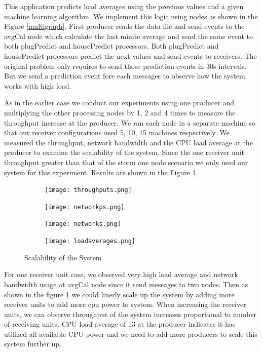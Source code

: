 This application predicts load averages using the previous values and a given machine learning algorithm. We implement this logic using nodes as shown in the Figure \ref{multigraph}. First producer reads the data file and send events to the avgCal node which calculate the last minite average and send the same event to both plugPredict and housePredict processors. Both plugPredict and housePredict processors predict the next values and send events to receivers. The original problem only requires to send those prediction events in 30s intervals. But we send a prediction event fore each messages to observe how the system works with high load.
 
As in the earlier case we conduct our experiments using one producer and multiplying the other processing nodes by 1, 2 and 4 times to measure the throughput increase at the producer. We ran each node in a separate machine so that our receiver configurations used 5, 10, 15 machines respectively. We measured the throughput,  network bandwidth and the CPU load average at the producer to examine the scalability of the system. Since the one receiver unit throughput greater than that of the storm one node scenario we only used our system for this experiment.  Results are shown in the Figure \ref{scalability}.

\begin{figure}
        \centering
        \begin{subfigure}[b]{0.45\textwidth}
                \texttt{[image: throughputs.png]}
        \end{subfigure}
        \begin{subfigure}[b]{0.45\textwidth}
                \texttt{[image: networkps.png]}
        \end{subfigure}
        \begin{subfigure}[b]{0.45\textwidth}
                \texttt{[image: networks.png]}
        \end{subfigure}
        \begin{subfigure}[b]{0.45\textwidth}
                \texttt{[image: loadaverages.png]}
        \end{subfigure}
        \caption{Scalability of the System}
        \label{scalability}
\end{figure} 

For one receiver unit case, we observed very high load average and network bandwidth usage at avgCal node since it send messages to two nodes. Then as shown in the figure \ref{scalability} we could linerly scale up the system by adding more receiver units to add more cpu power to system. When increasing the receiver units, we can observe throughput of the system increases proportional to number of receiving units. CPU load average of 13 at the producer indicates it has utilized all available CPU power and we need to add more producers to scale this system further up. 


